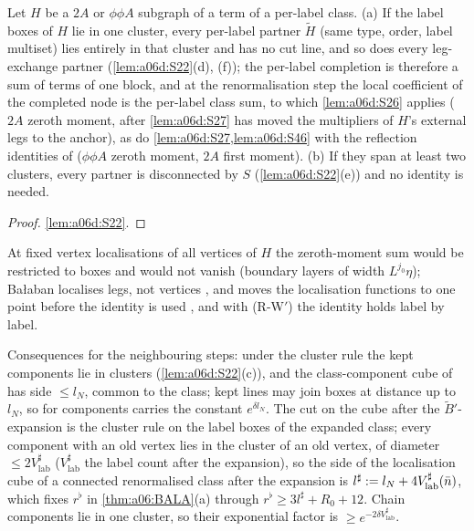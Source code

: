 \begin{theorem}\label{thm:a06d:S28}
Let $H$ be a $2A$ or $\phi\phi A$ subgraph of a term of a per-label class. \textup{(a)} If the label boxes of $H$ lie in one cluster, every per-label partner $\tilde H$ (same type, order, label multiset) lies entirely in that cluster and has no cut line, and so does every leg-exchange partner (\cref{lem:a06d:S22}(d), (f)); the per-label completion is therefore a sum of terms of one block, and at the renormalisation step the local coefficient of the completed node is the per-label class sum, to which \cref{lem:a06d:S26} applies ($2A$ zeroth moment, after \cref{lem:a06d:S27} has moved the multipliers of $H$'s external legs to the anchor), as do \cref{lem:a06d:S27,lem:a06d:S46} with the reflection identities of \cite[(3.30)]{Ba3} ($\phi\phi A$ zeroth moment, $2A$ first moment). \textup{(b)} If they span at least two clusters, every partner is disconnected by $S$ (\cref{lem:a06d:S22}(e)) and no identity is needed.
\end{theorem}

\begin{proof}
\cref{lem:a06d:S22}.
\end{proof}

At fixed vertex localisations of all vertices of $H$ the zeroth-moment sum would be restricted to boxes and would not vanish (boundary layers of width $L^{j_0}\eta$); Ba{\l}aban localises legs, not vertices \cite[p.~420]{Ba3}, and moves the localisation functions to one point before the identity is used \cite[p.~444]{Ba3}, and with (R-W$'$) the identity holds label by label.

Consequences for the neighbouring steps: under the cluster rule the kept components lie in clusters (\cref{lem:a06d:S22}(c)), and the class-component cube of \cite[p.~432]{Ba3} has side $\le l_N$, common to the class; kept lines may join boxes at distance up to $l_N$, so \cite[(3.2)]{Ba3} for components carries the constant $e^{\delta l_N}$. The cut on the cube after the $\tilde B'$-expansion \cite[p.~433]{Ba3} is the cluster rule on the label boxes of the expanded class; every component with an old vertex lies in the cluster of an old vertex, of diameter $\le2V^\sharp_{\mathrm{lab}}$ ($V^\sharp_{\mathrm{lab}}$ the label count after the expansion), so the side of the localisation cube of a connected renormalised class after the expansion is $l^\sharp:= l_N+4V^\sharp_{\mathrm{lab}}(\bar n)$, which fixes $r^\flat$ in \cref{thm:a06:BALA}(a) through $r^\flat\ge3l^\sharp+R_0+12$. Chain components lie in one cluster, so their exponential factor is $\ge e^{-2\delta V^\sharp_{\mathrm{lab}}}$.
